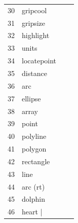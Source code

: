 \documentclass[10pt]{report}
\begin{document}
\begin{tabular}{llll}
30 & gripcool & & \\
31 & gripsize & & \\
32 & highlight & & \\
33 & units & & \\
34 & locatepoint & & \\
35 & distance & & \\
36 & arc & & \\
37 & ellipse & & \\
38 & array & & \\
39 & point & & \\
40 & polyline & & \\
41 & polygon & & \\
42 & rectangle & & \\
43 & line & & \\
44 & arc (rt) & & \\
45 & dolphin & & \\
46 & heart |
\end{tabular}
\end{document}
